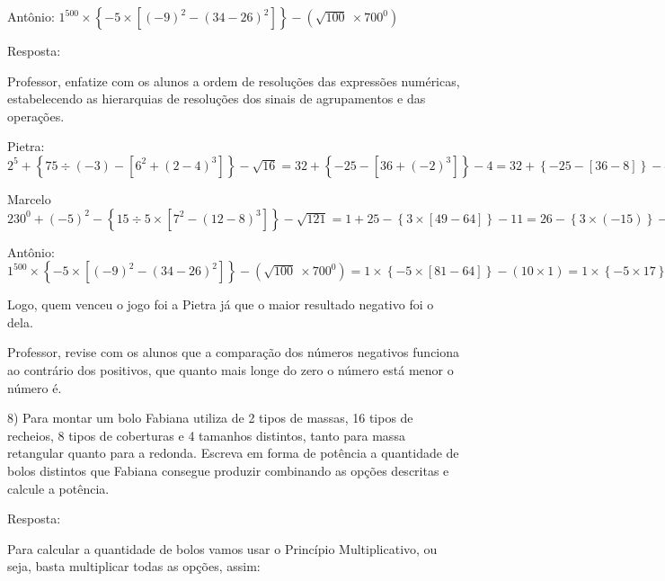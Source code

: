 {{Antônio:
\(1^{500} \times \left\{ - 5 \times \left\lbrack \left( - 9 \right)^{2} - \left( 34 - 26 \right)^{2} \right\rbrack \right\} - (\sqrt{100}\  \times 700^{0})\)

Resposta:

Professor, enfatize com os alunos a ordem de resoluções das expressões
numéricas, estabelecendo as hierarquias de resoluções dos sinais de
agrupamentos e das operações.

Pietra:\\
\(2^{5} + \left\{ 75 \div \left( - 3 \right) - \left\lbrack 6^{2} + \left( 2 - 4 \right)^{3} \right\rbrack \right\} - \sqrt{16} = 32 + \left\{ - 25 - \left\lbrack 36 + \left( - 2 \right)^{3} \right\rbrack \right\} - 4 = 32 + \left\{ - 25 - \left\lbrack 36 - 8 \right\rbrack \right\} - 4 = 32 + \left\{ - 25 - 28 \right\} - 4 = 32 - 53 - 4 = - 25\)

Marcelo\\
\(230^{0} + \left( - 5 \right)^{2} - \left\{ 15 \div 5 \times \left\lbrack 7^{2} - \left( 12 - 8 \right)^{3} \right\rbrack \right\} - \sqrt{121} = 1 + 25 - \left\{ 3 \times \left\lbrack 49 - 64 \right\rbrack \right\} - 11 = 26 - \left\{ 3 \times \left( - 15 \right) \right\} - 11 = 26 - \left\{ - 45 \right\} - 11 = 26 + 45 - 11 = 60\)

Antônio:
\(1^{500} \times \left\{ - 5 \times \left\lbrack \left( - 9 \right)^{2} - \left( 34 - 26 \right)^{2} \right\rbrack \right\} - \left( \sqrt{100}\  \times 700^{0} \right) = 1 \times \left\{ - 5 \times \left\lbrack 81 - 64 \right\rbrack \right\} - \left( 10 \times 1 \right) = 1 \times \left\{ - 5 \times 17 \right\} - 10 = 1 \times \left( - 85 \right) - 10 = - 85 - 10 = - 95\)

Logo, quem venceu o jogo foi a Pietra já que o maior resultado negativo
foi o dela.

Professor, revise com os alunos que a comparação dos números negativos
funciona ao contrário dos positivos, que quanto mais longe do zero o
número está menor o número é.

8) Para montar um bolo Fabiana utiliza de 2 tipos de massas, 16 tipos de
recheios, 8 tipos de coberturas e 4 tamanhos distintos, tanto para massa
retangular quanto para a redonda. Escreva em forma de potência a
quantidade de bolos distintos que Fabiana consegue produzir combinando
as opções descritas e calcule a potência.

Resposta:

Para calcular a quantidade de bolos vamos usar o Princípio
Multiplicativo, ou seja, basta multiplicar todas as opções, assim:

}}
